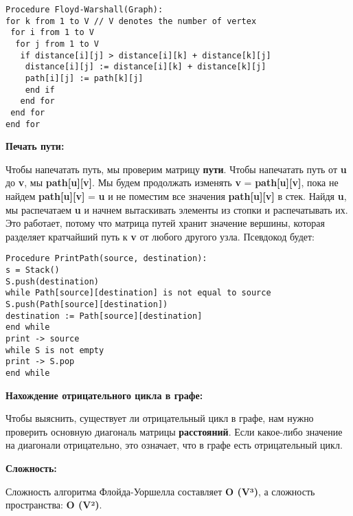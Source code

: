 \vspace{\baselineskip}
\begin{verbatim}
Procedure Floyd-Warshall(Graph):
for k from 1 to V // V denotes the number of vertex
 for i from 1 to V
  for j from 1 to V
   if distance[i][j] > distance[i][k] + distance[k][j]
    distance[i][j] := distance[i][k] + distance[k][j]
    path[i][j] := path[k][j]
    end if
   end for
 end for
end for
\end{verbatim}


\vspace{\baselineskip}
\textbf{Печать пути:}

\vspace{\baselineskip}
Чтобы напечатать путь, мы проверим матрицу \textbf{пути}. Чтобы напечатать путь от \textbf{u} до \textbf{v}, мы \textbf{path[u][v]}. Мы будем продолжать изменять \textbf{v} = \textbf{path[u][v]}, пока не найдем \textbf{path[u][v]} = \textbf{u} и не поместим все значения \textbf{path[u][v]} в стек. Найдя \textbf{u}, мы распечатаем \textbf{u} и начнем вытаскивать элементы из стопки и распечатывать их. Это работает, потому что матрица путей хранит значение вершины, которая разделяет кратчайший путь к \textbf{v} от любого другого узла. Псевдокод будет:

\vspace{\baselineskip}
\begin{verbatim}
Procedure PrintPath(source, destination):
s = Stack()
S.push(destination)
while Path[source][destination] is not equal to source
S.push(Path[source][destination])
destination := Path[source][destination]
end while
print -> source
while S is not empty
print -> S.pop
end while
\end{verbatim}


\vspace{\baselineskip}
\textbf{Нахождение отрицательного цикла в графе:}

\vspace{\baselineskip}
Чтобы выяснить, существует ли отрицательный  цикл в графе, нам нужно проверить основную диагональ матрицы \textbf{расстояний}. Если какое-либо значение на диагонали отрицательно, это означает, что в графе  есть отрицательный цикл.

\vspace{\baselineskip}
\textbf{Сложность:}
\vspace{\baselineskip}

Сложность алгоритма Флойда-Уоршелла составляет \textbf{O (V³)}, а сложность пространства: \textbf{O (V²)}.

